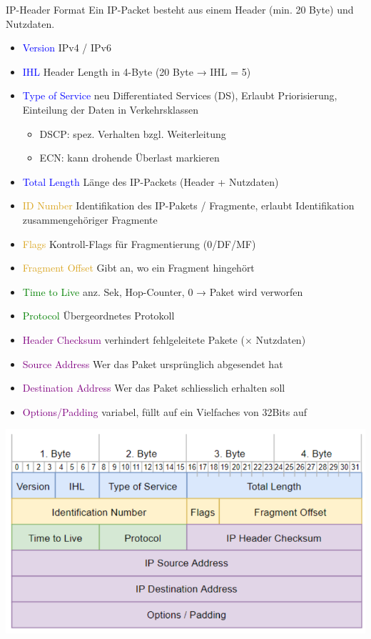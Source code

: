\begin{KR}{IP-Header Format}
    Ein IP-Packet besteht aus einem Header (min. 20 Byte) und Nutzdaten.
    \begin{itemize}
        \item \textcolor{blue}{Version} IPv4 / IPv6
        \item \textcolor{blue}{IHL} Header Length in 4-Byte (20 Byte → IHL = 5)
        \item \textcolor{blue}{Type of Service} neu Differentiated Services (DS), Erlaubt Priorisierung, Einteilung der Daten in Verkehrsklassen
        \begin{itemize}
            \item DSCP: spez. Verhalten bzgl. Weiterleitung
            \item ECN: kann drohende Überlast markieren
        \end{itemize}
        \item \textcolor{blue}{Total Length} Länge des IP-Packets (Header + Nutzdaten)
        \item \textcolor{Goldenrod}{ID Number} Identifikation des IP-Pakets / Fragmente, erlaubt Identifikation zusammengehöriger Fragmente
        \item \textcolor{Goldenrod}{Flags} Kontroll-Flags für Fragmentierung (0/DF/MF)
        \item \textcolor{Goldenrod}{Fragment Offset} Gibt an, wo ein Fragment hingehört
        \item \textcolor{green}{Time to Live} anz. Sek, Hop-Counter, 0 → Paket wird verworfen
        \item \textcolor{green}{Protocol} Übergeordnetes Protokoll
        \item \textcolor{purple}{Header Checksum} verhindert fehlgeleitete Pakete ($\times $ Nutzdaten)
        \item \textcolor{purple}{Source Address} Wer das Paket ursprünglich abgesendet hat
        \item \textcolor{purple}{Destination Address} Wer das Paket schliesslich erhalten soll
        \item \textcolor{purple}{Options/Padding} variabel, füllt auf ein Vielfaches von 32Bits auf
    \end{itemize}
        \includegraphics[width=1\linewidth]{images/internet_protokoll_format_ip.png}\\

\end{KR}
